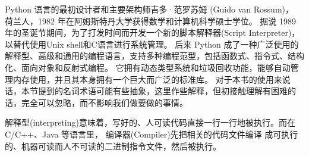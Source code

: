 \documentclass[main.tex]{subfiles}
\begin{document}
Python 语言的最初设计者和主要架构师吉多·范罗苏姆 (Guido van Rossum)， 荷兰人，1982 年在阿姆斯特丹大学获得数学和计算机科学硕士学位。
据说 1989 年的圣诞节期间，为了打发时间而开发一个新的脚本解释器(Script Interpreter)，以替代使用Unix shell和C语言进行系统管理。
后来 Python 成了一种广泛使用的解释型、高级和通用的编程语言，支持多种编程范型，包括函数式、指令式、结构化、面向对象和反射式编程。
它拥有动态类型系统和垃圾回收功能，能够自动管理内存使用，并且其本身拥有一个巨大而广泛的标准库。
对于本书的使用来说话，本节提到的名词术语可能有些抽象，这里作些解释，但初接触理解有困难的话，完全可以忽略，而不影响我们做要做的事情。

解释型(interpreting)意味着，写好的、人可读代码直接一行一行地被执行。而在 C/C++、Java 等语言里， 编译器(Compiler)先把相关的代码文件编译
成可执行的、机器可读而人不可读的二进制指令文件，然后被执行。
\end{document}
